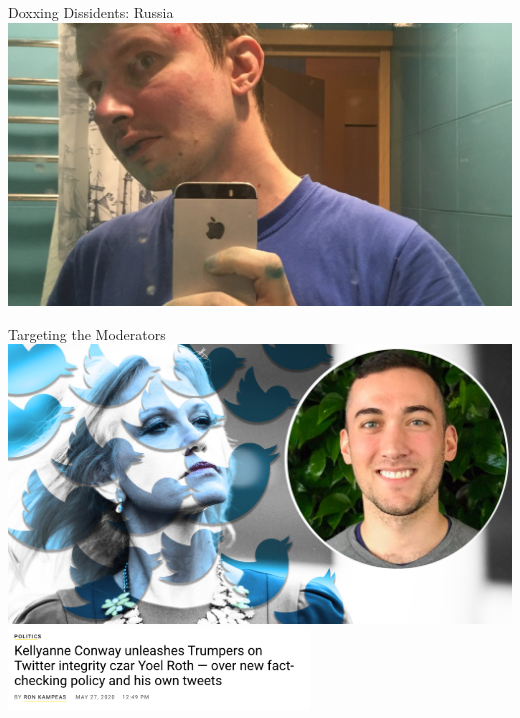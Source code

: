 \documentclass[nobackground,dvipsnames,table,aspectratio=169]{beamer}
\begin{document}
\begin{frame}{Doxxing Dissidents: Russia}
    \includegraphics[width=\textwidth]{russian-dissident}
\end{frame}

\begin{frame}{Targeting the Moderators}
    \includegraphics[width=\textwidth]{conway-roth}
    \includegraphics[width=0.6\textwidth]{conway-roth-headline}
\end{frame}
\end{document}
